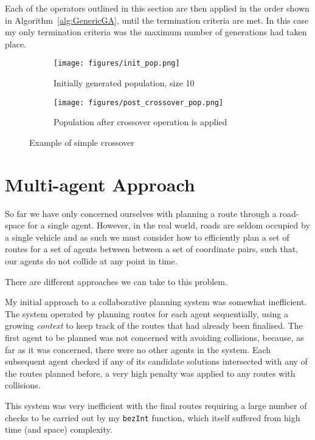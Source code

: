 Each of the operators outlined in this section are then applied in the order shown in Algorithm~\ref{alg:GenericGA}, until the termination criteria are met. In this case my only termination criteria was the maximum number of generations had taken place.

\begin{figure}
  \centering
  \begin{subfigure}[b]{0.44\textwidth}
    \centering
    \texttt{[image: figures/init\_pop.png]}
    \caption{Initially generated population, size 10}
  \end{subfigure}
  \begin{subfigure}[b]{0.44\textwidth}
    \centering
    \texttt{[image: figures/post\_crossover\_pop.png]}
    \caption{Population after crossover operation is applied}
  \end{subfigure}
  \caption{\label{fig:crossover_eg} Example of simple crossover}
\end{figure}

\section{Multi-agent Approach}
\label{sec:maa}

So far we have only concerned ourselves with planning a route through a road-space for a single agent. However, in the real world, roads are seldom occupied by a single vehicle and as such we must consider how to efficiently plan a set of routes for a set of agents between between a set of coordinate pairs, such that, our agents do not collide at any point in time.

There are different approaches we can take to this problem.

My initial approach to a collaborative planning system was somewhat inefficient. The system operated by planning routes for each agent sequentially, using a growing \textit{context} to keep track of the routes that had already been finalised. The first agent to be planned was not concerned with avoiding collisions, because, as far as it was concerned, there were no other agents in the system. Each subsequent agent checked if any of its candidate solutions intersected with any of the routes planned before, a very high penalty was applied to any routes with collisions.

This system was very inefficient with the final routes requiring a large number of checks to be carried out by my \texttt{bezInt} function, which itself suffered from high time (and space) complexity.

